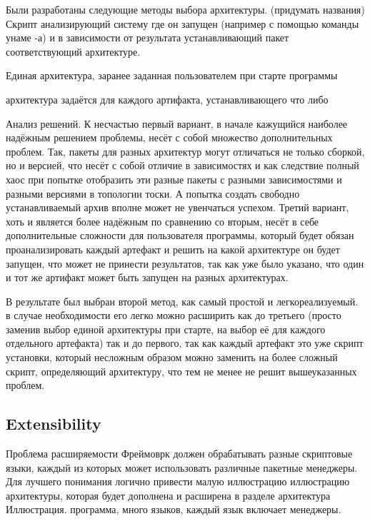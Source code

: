 Были разработаны следующие методы выбора архитектуры. 
(придумать названия)
Скрипт анализирующий систему где он запущен (например с помощью команды унаме -а) и в зависимости от результата устанавливающий пакет соответствующий архитектуре. 

Единая архитектура, заранее заданная пользователем при старте программы

архитектура задаётся для каждого артифакта, устанавливающего что либо

Анализ решений. К несчастью первый вариант, в начале кажущийся наиболее надёжным решением проблемы, несёт с собой множество дополнительных проблем. Так, пакеты для разных архитектур могут отличаться не только сборкой, но и версией, что несёт с собой отличие в зависимостях и как следствие полный хаос при попытке отобразить эти разные пакеты с разными зависимостями и разными версиями в топологии тоски. А попытка создать свободно устанавливаемый архив вполне может не увенчаться успехом. 
Третий вариант, хоть и является более надёжным по сравнению со вторым, несёт в себе дополнительные сложности для пользователя программы, который будет обязан проанализировать каждый артефакт и решить на какой архитектуре он будет запущен, что может не принести результатов, так как уже было указано, что один и тот же артифакт может быть запущен на разных архитектурах.

В результате был выбран второй метод, как самый простой и легкореализуемый. в случае необходимости его легко можно расширить как до третьего (просто заменив выбор единой архитектуры при старте, на выбор её для каждого отдельного артефакта) так и до первого, так как каждый артефакт это уже скрипт установки, который несложным образом можно заменить на более сложный скрипт, определяющий архитектуру, что тем не менее не решит вышеуказанных проблем.


\fi
\subsection*{Extensibility}
Проблема расширяемости
Фреймоврк должен обрабатывать разные скриптовые языки, каждый из которых может использовать различные пакетные менеджеры.
Для лучшего понимания логично привести малую иллюстрацию иллюстрацию архитектуры, которая будет дополнена и расширена в разделе архитектура
Иллюстрация. программа, много языков, каждый язык включает менеджеры.

\fi

